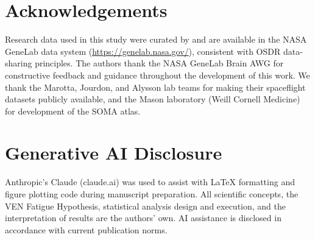 \documentclass[11pt]{article}
\begin{document}
\section*{Acknowledgements}

Research data used in this study were curated by and are available in
the NASA GeneLab data system (\url{https://genelab.nasa.gov/}),
consistent with OSDR data-sharing principles.
The authors thank the NASA GeneLab Brain AWG for constructive feedback
and guidance throughout the development of this work.
We thank the Marotta, Jourdon, and Alysson lab teams for making their
spaceflight datasets publicly available, and the Mason laboratory
(Weill Cornell Medicine) for development of the SOMA atlas.

\section*{Generative AI Disclosure}

Anthropic's Claude (claude.ai) was used to assist with \LaTeX{}
formatting and figure plotting code during manuscript preparation.
All scientific concepts, the VEN Fatigue Hypothesis, statistical
analysis design and execution, and the interpretation of results are
the authors' own.
AI assistance is disclosed in accordance with current publication norms.



\end{document}
